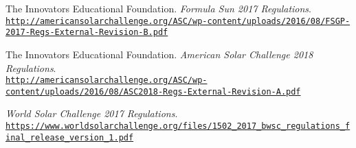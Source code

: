 \documentclass[12pt,letterpaper]{article}
\begin{document}
	
	\hypersetup{pageanchor=false}
	
	\newpage
	\hypersetup{pageanchor=true}
	\newpage
	
	
	
	
	
		
	
		
	
	\begin{thebibliography}{10}

		The Innovators Educational Foundation. \textit{Formula Sun 2017 Regulations}. \\		
		\texttt{\url{http://americansolarchallenge.org/ASC/wp-content/uploads/2016/08/FSGP-2017-Regs-External-Revision-B.pdf}}
		
		The Innovators Educational Foundation. \textit{American Solar Challenge 2018 Regulations}. \\		
		\texttt{\url{http://americansolarchallenge.org/ASC/wp-content/uploads/2016/08/ASC2018-Regs-External-Revision-A.pdf}}	

		\textit{World Solar Challenge 2017 Regulations}. \\		
		\texttt{\url{https://www.worldsolarchallenge.org/files/1502_2017_bwsc_regulations_final_release_version_1.pdf}}
		
		
		
	\end{thebibliography}
\end{document}
